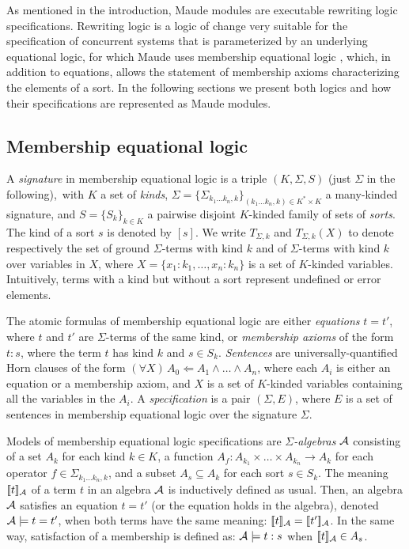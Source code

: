 
As mentioned in the introduction, Maude modules are executable rewriting logic specifications.
Rewriting logic \cite{Meseguer92-tcs} is a logic of change very suitable
for the specification of concurrent systems that is parameterized
by an underlying equational logic, for which Maude uses membership
equational logic \cite{BouhoulaJouannaudMeseguer00,Meseguer97},
which, in addition to equations, allows the statement of membership
axioms characterizing the elements of a sort. In the following sections we
present both logics and how their specifications are represented as Maude modules.

\subsection{Membership equational logic} \label{mel-section}

A \emph{signature} in membership equational logic is a triple $(K,\Sigma, S)$
(just $\Sigma$ in the following),\
with $K$ a set of {\em kinds},
$\Sigma = \{\Sigma_{k_1\ldots k_n,k}\}_{(k_1\ldots k_n,k)\in K^{*}\times K}$ a
many-kinded signature, and $S =
\{S_{k}\}_{k\in K}$ a pairwise disjoint $K$-kinded family of sets of
\emph{sorts}.
The kind of a sort $s$ is denoted by $[s]$.
We write $T_{\Sigma,k}$ and $T_{\Sigma,k}(X)$ to denote respectively the set
of ground
$\Sigma$-terms with kind $k$ and of $\Sigma$-terms with kind $k$ over variables
in $X$, where $X = \{ x_1:k_1, \dots, x_n:k_n\}$ is a set of $K$-kinded
variables.
Intuitively, terms with a kind but without a sort represent undefined or error
elements.

The atomic formulas of membership equational logic are either \emph{equations}
$t = t'$, where $t$ and $t'$ are $\Sigma$-terms of the same kind, or
\emph{membership axioms} of the form $t : s$, where the term $t$
has kind $k$ and $s \in S_k$.
\emph{Sentences} are universally-quantified Horn clauses of the
form $(\forall X)\, A_0 \Leftarrow A_1 \wedge \ldots \wedge A_n$,
where each $A_i$ is  either an equation or a membership axiom, and $X$ is a
set of $K$-kinded variables containing all the variables in the $A_i$.
A \emph{specification} is a pair $(\Sigma,E)$, where $E$ is a set
of sentences in membership equational logic over the signature $\Sigma$.

Models of membership equational logic specifications are
\emph{$\Sigma$-algebras} $\mathcal{A}$ consisting of a set $A_k$ for each kind $k \in K$,
a function $A_f : A_{k_1}\times \dots \times A_{k_n} \longrightarrow A_k$ for each 
operator $f \in \Sigma_{k_1 \dots k_n, k}$, and
a subset $A_s \subseteq A_k$ for each sort $s\in S_k$. The meaning
$[\![t]\!]_{\mathcal{A}}$ of a term $t$ in an algebra $\mathcal{A}$ is inductively defined as usual.
Then, an algebra $\mathcal{A}$ satisfies an equation $t = t'$  (or the equation holds
in the algebra), denoted $\mathcal{A} \models t = t'$, when both terms have the same meaning:
$[\![t]\!]_{\mathcal{A}} = [\![t']\!]_{\mathcal{A}}$. In the same way, satisfaction of a membership is defined as:
$\mathcal{A} \models t : s$ when $[\![t]\!]_{\mathcal{A}} \in A_s$.


